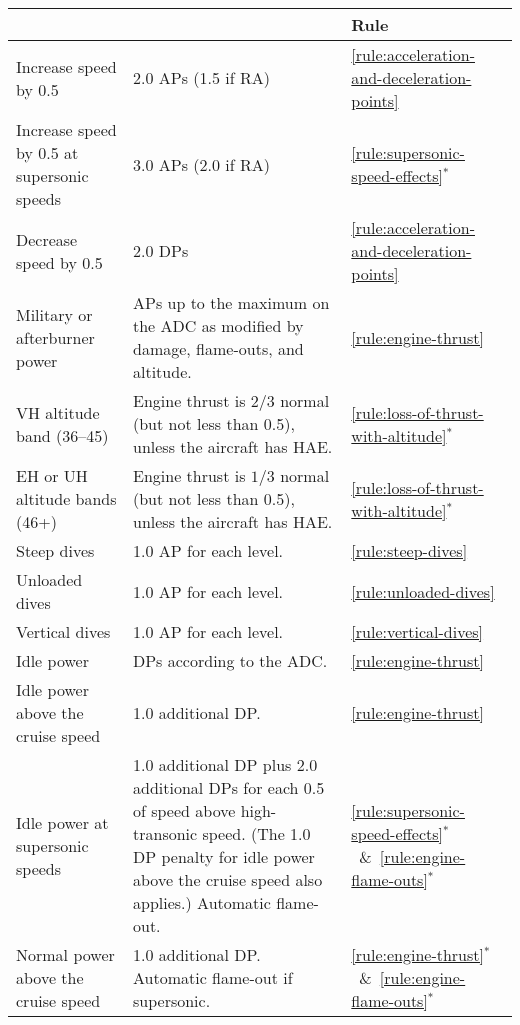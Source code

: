 {}{

\begin{twocolumntablefloat}[tp]
\begin{twocolumntable}


\begin{tabularx}{0.9\linewidth}{lLl}
\toprule
&&Rule\\
\midrule
\addlinespace
Increase speed by 0.5&2.0 APs (1.5 if RA)&\mbox{\ref{rule:acceleration-and-deceleration-points}}\\
Increase speed by 0.5 at supersonic speeds&3.0 APs (2.0 if RA)&\mbox{\ref{rule:supersonic-speed-effects}$^*$}\\
Decrease speed by 0.5&2.0 DPs&\mbox{\ref{rule:acceleration-and-deceleration-points}}\\
\addlinespace
\midrule
\addlinespace
Military or afterburner power&APs up to the maximum on the ADC as modified by damage, flame-outs, and altitude.&\mbox{\ref{rule:engine-thrust}}\\
VH altitude band (36--45)&Engine thrust is $2/3$ normal (but not less than 0.5), unless the aircraft has HAE.&\mbox{\ref{rule:loss-of-thrust-with-altitude}$^*$}\\
EH or UH altitude bands (46+)&Engine thrust is $1/3$ normal (but not less than 0.5), unless the aircraft has HAE.&\mbox{\ref{rule:loss-of-thrust-with-altitude}$^*$}\\
\addlinespace
Steep dives&1.0 AP for each level.&\mbox{\ref{rule:steep-dives}}\\
Unloaded dives&1.0 AP for each level.&\mbox{\ref{rule:unloaded-dives}}\\
Vertical dives&1.0 AP for each level.&\mbox{\ref{rule:vertical-dives}}\\
\addlinespace
\midrule
\addlinespace
Idle power&DPs according to the ADC.&\mbox{\ref{rule:engine-thrust}}\\
Idle power above the cruise speed&1.0 additional DP.&\mbox{\ref{rule:engine-thrust}}\\
Idle power at supersonic speeds&1.0 additional DP plus 2.0 additional DPs for each 0.5 of speed above high-transonic speed. (The 1.0 DP penalty for idle power above the cruise speed also applies.) Automatic flame-out.&\mbox{\ref{rule:supersonic-speed-effects}$^*$ \& \ref{rule:engine-flame-outs}$^*$}\\
Normal power above the cruise speed&1.0 additional DP. Automatic flame-out if supersonic.&\mbox{\ref{rule:engine-thrust}$^*$ \& \ref{rule:engine-flame-outs}$^*$}\\

\end{tabularx}
\end{twocolumntable}
\end{twocolumntablefloat}}
